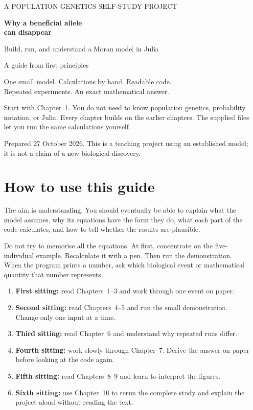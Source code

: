 \documentclass[11pt,a4paper,oneside]{report}
\begin{document}
\begin{titlepage}
\vspace*{18mm}
{\color{accent}\large A POPULATION GENETICS SELF-STUDY PROJECT\par}
\vspace{12mm}
{\color{ink}\Huge\bfseries Why a beneficial allele\\[3mm]can disappear\par}
\vspace{9mm}
{\Large Build, run, and understand a Moran model in Julia\par}
\vspace{16mm}
{\large A guide from first principles\par}
\vspace{5mm}
One small model. Calculations by hand. Readable code.\\
Repeated experiments. An exact mathematical answer.
\vfill
\begin{tcolorbox}[colback=pale,colframe=accent,boxrule=0.5pt]
Start with Chapter~1. You do not need to know population genetics, probability notation, or Julia. Every chapter builds on the earlier chapters. The supplied files let you run the same calculations yourself.
\end{tcolorbox}
\vspace{8mm}
{\small Prepared 27 October 2026. This is a teaching project using an established model; it is not a claim of a new biological discovery.}
\end{titlepage}
\chapter*{How to use this guide}
The aim is understanding. You should eventually be able to explain what the model assumes, why its equations have the form they do, what each part of the code calculates, and how to tell whether the results are plausible.

Do not try to memorise all the equations. At first, concentrate on the five-individual example. Recalculate it with a pen. Then run the demonstration. When the program prints a number, ask which biological event or mathematical quantity that number represents.

\begin{enumerate}
\item \textbf{First sitting:} read Chapters~1--3 and work through one event on paper.
\item \textbf{Second sitting:} read Chapters~4--5 and run the small demonstration. Change only one input at a time.
\item \textbf{Third sitting:} read Chapter~6 and understand why repeated runs differ.
\item \textbf{Fourth sitting:} work slowly through Chapter~7. Derive the answer on paper before looking at the code again.
\item \textbf{Fifth sitting:} read Chapters~8--9 and learn to interpret the figures.
\item \textbf{Sixth sitting:} use Chapter~10 to rerun the complete study and explain the project aloud without reading the text.
\end{enumerate}
\end{document}
